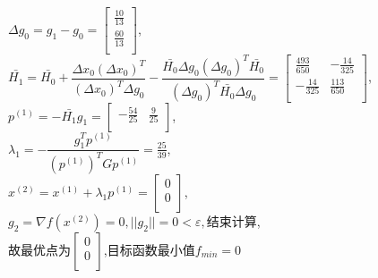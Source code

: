\begin{solution}
    $\Delta g_0=g_1-g_0=\begin{bmatrix} \frac{10}{13}\\\frac{60}{13}\\\end{bmatrix}$,\\
    $\bar{H_1}=\bar{H_0}+\dfrac{\Delta x_0(\Delta x_0)^T}{(\Delta x_0)^T\Delta g_0}-\dfrac{\bar{H_0}\Delta g_0(\Delta g_0)^T\bar{H_0}}{(\Delta g_0)^T\bar{H_0}\Delta g_0}=\begin{bmatrix}
        \frac{493}{650}&-\frac{14}{325}\\
        -\frac{14}{325}&\frac{113}{650}\\\end{bmatrix}$,\\
    $p^{(1)}=-\bar{H_1}g_1=\begin{bmatrix}        -\frac{54}{25}&\frac{9}{25}\\\end{bmatrix}$,\\
    $\lambda_1=-\dfrac{g_1^Tp^{(1)}}{(p^{(1)})^TGp^{(1)}}=\frac{25}{39}$,\\
    $x^{(2)}=x^{(1)}+\lambda_1p^{(1)}=\begin{bmatrix} 0\\0\\\end{bmatrix}$,\\
    $g_2=\nabla f(x^{(2)})=0,||g_2||=0<\varepsilon,\text{结束计算}$,\\
    故最优点为$\begin{bmatrix} 0\\0\\\end{bmatrix}$,目标函数最小值$f_{min}=0$
\end{solution}
